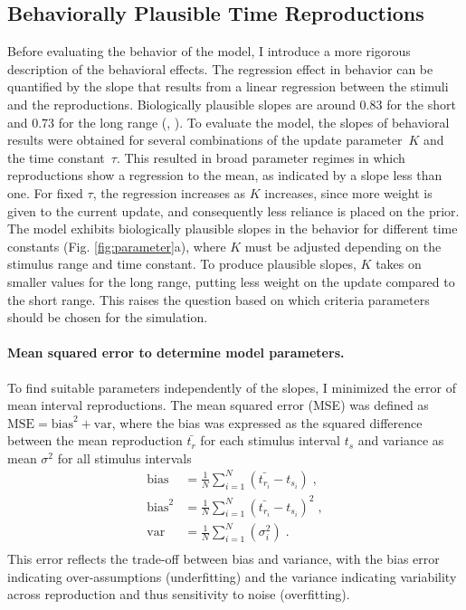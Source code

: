 \documentclass[10pt, a4paper]{article}
\begin{document}
\subsection{Behaviorally Plausible Time Reproductions}
Before evaluating the behavior of the model, I introduce a more rigorous description of the behavioral effects. 
The regression effect in behavior can be quantified by the slope that results from a linear regression between the stimuli and the reproductions.
Biologically plausible slopes are around 0.83 for the short and 0.73 for the long range (\cite{Sohn2019}, \cite{Henke2021}). 
To evaluate the model, the slopes of behavioral results were obtained for several combinations of the update parameter~$K$ and the time constant~$\tau$.
This resulted in broad parameter regimes in which reproductions show a regression to the mean, as indicated by a slope less than one. 
For fixed $\tau$, the regression increases as $K$ increases, since more weight is given to the current update, and consequently less reliance is placed on the prior. 
The model exhibits biologically plausible slopes in the behavior for different time constants (Fig. \ref{fig:parameter}a), where $K$ must be adjusted depending on the stimulus range and time constant. 
To produce plausible slopes, $K$ takes on smaller values for the long range, putting less weight on the update compared to the short range.
This raises the question based on which criteria parameters should be chosen for the simulation.

\paragraph{Mean squared error to determine model parameters.}
To find suitable parameters independently of the slopes, I minimized the error of mean interval reproductions. The mean squared error (MSE) was defined as $\text{MSE} = \text{bias}^2+\text{var}$, where the bias was expressed as the squared difference between the mean reproduction $\bar{t_{r}}$ for each stimulus interval $t_s$ and variance as mean $\sigma^2$ for all stimulus intervals
\begin{equation} \label{MSE}
	\begin{split}
	 \text{bias} & = \frac{1}{N} \sum \limits_{i=1}^{N} (\bar{t_{r_i}} - t_{s_i}) \;,\\
	 \text{bias}^2 & = \frac{1}{N} \sum \limits_{i=1}^{N}(\bar{t_{r_i}} - t_{s_i})^2 \;,\\
	 \text{var} & = \frac{1}{N} \sum \limits_{i=1}^{N}(\sigma_i^2) \;.\\
	\end{split}
\end{equation}
This error reflects the trade-off between bias and variance, with the bias error indicating over-assumptions (underfitting) and the variance indicating variability across reproduction and thus sensitivity to noise (overfitting).
\end{document}
